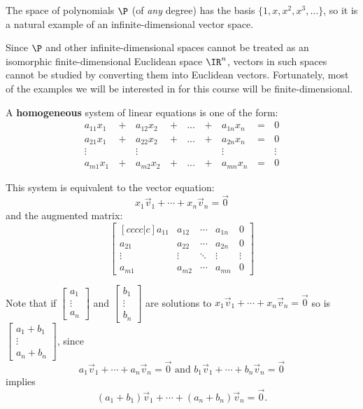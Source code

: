 \begin{applicationActivities}
\begin{observation}
  The space of polynomials \(\P\) (of \textit{any} degree)
  has the basis \(\{1,x,x^2,x^3,\dots\}\),
  so it is a natural example of an infinite-dimensional vector space.

  \vspace{1em}

  Since \(\P\) and other infinite-dimensional spaces cannot be treated as
  an isomorphic finite-dimensional Euclidean space \(\IR^n\), vectors in
  such spaces cannot be studied by converting them into Euclidean vectors.
  Fortunately, most of the examples we will be
  interested in for this course will be finite-dimensional.
\end{observation}

\begin{definition}
A \textbf{homogeneous} system of linear equations is one of the form:
  \begin{alignat*}{5}
    a_{11}x_1 &\,+\,& a_{12}x_2 &\,+\,& \dots  &\,+\,& a_{1n}x_n &\,=\,& 0 \\
    a_{21}x_1 &\,+\,& a_{22}x_2 &\,+\,& \dots  &\,+\,& a_{2n}x_n &\,=\,& 0 \\
     \vdots&  &\vdots&   &&  &\vdots&&\vdots  \\
    a_{m1}x_1 &\,+\,& a_{m2}x_2 &\,+\,& \dots  &\,+\,& a_{mn}x_n &\,=\,& 0
  \end{alignat*}

  This system is equivalent to the vector equation:
  \[x_1 \vec{v}_1 + \cdots+x_n \vec{v}_n = \vec{0}\]
  and the augmented matrix:
  \[
    \begin{bmatrix}[cccc|c]
      a_{11} & a_{12} & \cdots & a_{1n} & 0\\
      a_{21} & a_{22} & \cdots & a_{2n} & 0\\
      \vdots & \vdots & \ddots & \vdots & \vdots\\
      a_{m1} & a_{m2} & \cdots & a_{mn} & 0
    \end{bmatrix}
  \]
\end{definition}

\begin{activity}{5}
Note that if \(\begin{bmatrix} a_1 \\ \vdots \\ a_n \end{bmatrix} \) and
\(\begin{bmatrix} b_1 \\ \vdots \\ b_n \end{bmatrix} \) are solutions to
\(x_1 \vec{v}_1 + \cdots+x_n \vec{v}_n = \vec{0}\)
so is  \(\begin{bmatrix} a_1 +b_1\\ \vdots \\ a_n+b_n \end{bmatrix} \), since
\[a_1 \vec{v}_1+\cdots+a_n \vec{v}_n = \vec{0}
\text{ and }
b_1 \vec{v}_1+\cdots+b_n \vec{v}_n = \vec{0} \]
implies
\[(a_1 + b_1) \vec{v}_1+\cdots+(a_n+b_n) \vec{v}_n = \vec{0} .\]


\end{activity}
\end{applicationActivities}
